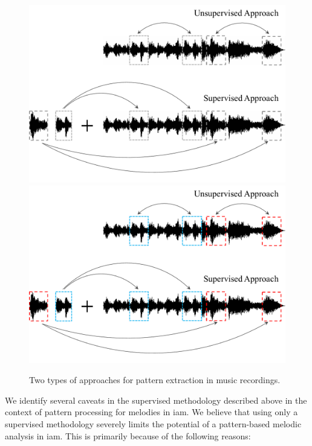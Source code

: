 \begin{figure}
	\begin{center}
		\ifdefined\PRINTVER
			\includegraphics[width=\figSizeEighty]{ch06_patterns/figures/discovery/TwoTypesOfMethodology_BW.pdf}
		\else
			\includegraphics[width=\figSizeEighty]{ch06_patterns/figures/discovery/TwoTypesOfMethodology.pdf}
		\fi
	\end{center}
	\caption{Two types of approaches for pattern extraction in music recordings.}
	\label{fig:types_of_methodologies_for_extraction}
\end{figure}

We identify several caveats in the supervised methodology described above in the context of pattern processing for melodies in \gls{iam}. We believe that using only a supervised methodology severely limits the potential of a pattern-based melodic analysis in \gls{iam}. This is primarily because of the following reasons:

